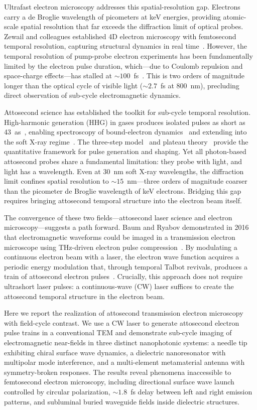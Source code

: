 \documentclass[12pt]{article}
\begin{document}
Ultrafast electron microscopy addresses this spatial-resolution gap. Electrons carry a de Broglie wavelength of picometers at keV energies, providing atomic-scale spatial resolution that far exceeds the diffraction limit of optical probes. Zewail and colleagues established 4D electron microscopy with femtosecond temporal resolution, capturing structural dynamics in real time~\cite{Zewail2010,Shorokhov2016}. However, the temporal resolution of pump-probe electron experiments has been fundamentally limited by the electron pulse duration, which---due to Coulomb repulsion and space-charge effects---has stalled at ${\sim}100$~fs~\cite{Zhu2014}. This is two orders of magnitude longer than the optical cycle of visible light (${\sim}2.7$~fs at 800~nm), precluding direct observation of sub-cycle electromagnetic dynamics.

Attosecond science has established the toolkit for sub-cycle temporal resolution. High-harmonic generation (HHG) in gases produces isolated pulses as short as 43~as~\cite{Li2020_as}, enabling spectroscopy of bound-electron dynamics~\cite{Hentschel2001,Drescher2001} and extending into the soft X-ray regime~\cite{Popmintchev2012}. The three-step model~\cite{Corkum1993} and plateau theory~\cite{Antoine1996} provide the quantitative framework for pulse generation and shaping. Yet all photon-based attosecond probes share a fundamental limitation: they probe with light, and light has a wavelength. Even at 30~nm soft X-ray wavelengths, the diffraction limit confines spatial resolution to ${\sim}15$~nm---three orders of magnitude coarser than the picometer de Broglie wavelength of keV electrons. Bridging this gap requires bringing attosecond temporal structure into the electron beam itself.

The convergence of these two fields---attosecond laser science and electron microscopy---suggests a path forward. Baum and Ryabov demonstrated in 2016 that electromagnetic waveforms could be imaged in a transmission electron microscope using THz-driven electron pulse compression~\cite{Ryabov2016}. By modulating a continuous electron beam with a laser, the electron wave function acquires a periodic energy modulation that, through temporal Talbot revivals, produces a train of attosecond electron pulses~\cite{Tsarev2021}. Crucially, this approach does not require ultrashort laser pulses: a continuous-wave (CW) laser suffices to create the attosecond temporal structure in the electron beam.

Here we report the realization of attosecond transmission electron microscopy with field-cycle contrast. We use a CW laser to generate attosecond electron pulse trains in a conventional TEM and demonstrate sub-cycle imaging of electromagnetic near-fields in three distinct nanophotonic systems: a needle tip exhibiting chiral surface wave dynamics, a dielectric nanoresonator with multipolar mode interference, and a multi-element metamaterial antenna with symmetry-broken responses. The results reveal phenomena inaccessible to femtosecond electron microscopy, including directional surface wave launch controlled by circular polarization, ${\sim}1.8$~fs delay between left and right emission patterns, and subluminal buried waveguide fields inside dielectric structures.
\end{document}

